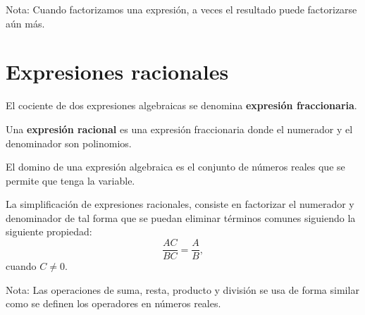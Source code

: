 \documentclass[a4,11pt]{aleph-notas}
\begin{document}
Nota: Cuando factorizamos una expresi\'on, a veces el resultado puede factorizarse a\'un m\'as.
\newpage
\section{Expresiones racionales}
\begin{defi}
	El cociente de dos expresiones algebraicas se denomina \textbf{expresi\'on fraccionaria}.
	
	Una \textbf{expresi\'on racional} es una expresi\'on fraccionaria donde el numerador y el denominador son polinomios.
\end{defi}

\begin{defi}[Dominio]
	El domino de una expresi\'on algebraica es el conjunto de n\'umeros reales que se permite que tenga la variable.
\end{defi}

\begin{prop}
	La simplificaci\'on de expresiones racionales, consiste en factorizar el numerador y denominador de tal forma que se puedan eliminar t\'erminos comunes siguiendo la siguiente propiedad:
	$$
	\frac{AC}{BC} = \frac{A}{B},
	$$
	cuando $C \neq 0$.
\end{prop}

Nota: Las operaciones de suma, resta, producto y divisi\'on se usa de forma similar como se definen los operadores en n\'umeros reales.
\end{document}
